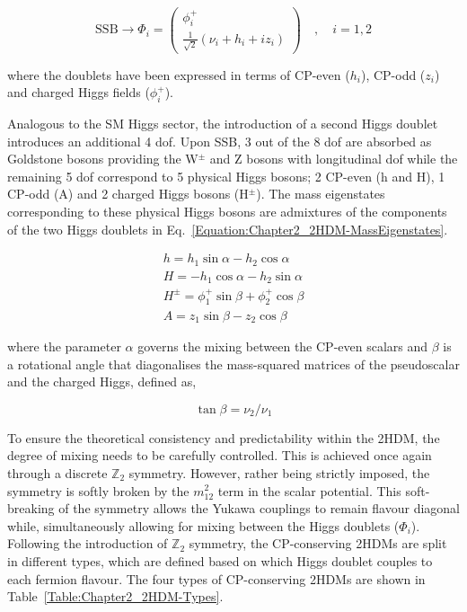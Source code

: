 \begin{equation}
    \text{SSB} \rightarrow\Phi_i = \begin{pmatrix}
        \phi_i^+ \\
        \frac{1}{\sqrt{2}}(\nu_i + h_i + iz_i)
    \end{pmatrix} \quad,\quad i=1,2
\end{equation}

where the doublets have been expressed in terms of CP-even ($h_i$), CP-odd ($z_i$) and charged Higgs fields ($\phi_i^+$).

Analogous to the SM Higgs sector, the introduction of a second Higgs doublet introduces an additional 4 dof. Upon SSB, 3 out of the 8 dof are absorbed as Goldstone bosons providing the W$^{\pm}$ and Z bosons with longitudinal dof while the remaining 5 dof correspond to 5 physical Higgs bosons; 2 CP-even (h and H), 1 CP-odd (A) and 2 charged Higgs bosons (H$^{\pm}$). The mass eigenstates corresponding to these physical Higgs bosons are admixtures of the components of the two Higgs doublets in Eq.~\ref{Equation:Chapter2_2HDM-MassEigenstates}.

\begin{equation}
\begin{array}{c}
     h = h_1 \sin{\alpha} - h_2 \cos{\alpha} \\
     H = - h_1 \cos{\alpha} - h_2 \sin{\alpha} \\
     H^\pm = \phi_1^+ \sin{\beta} + \phi_2^+ \cos{\beta} \\
     A = z_1 \sin{\beta} - z_2 \cos{\beta}
\end{array}
\label{Equation:Chapter2_2HDM-MassEigenstates}
\end{equation}

where the parameter $\alpha$ governs the mixing between the CP-even scalars and $\beta$ is a rotational angle that diagonalises the mass-squared matrices of the pseudoscalar and the charged Higgs, defined as,

\begin{equation}
    \tan{\beta} = \nu_2/\nu_1
\end{equation}

To ensure the theoretical consistency and predictability within the 2HDM, the degree of mixing needs to be carefully controlled. This is achieved once again through a discrete $\mathbb{Z}_2$ symmetry. However, rather being strictly imposed, the symmetry is softly broken by the $m_{12}^2$ term in the scalar potential. This soft-breaking of the symmetry allows the Yukawa couplings to remain flavour diagonal while, simultaneously allowing for mixing between the Higgs doublets ($\Phi_i$). Following the introduction of $\mathbb{Z}_2$ symmetry, the CP-conserving 2HDMs are split in different types, which are defined based on which Higgs doublet couples to each fermion flavour. The four types of CP-conserving 2HDMs are shown in Table~\ref{Table:Chapter2_2HDM-Types}.

